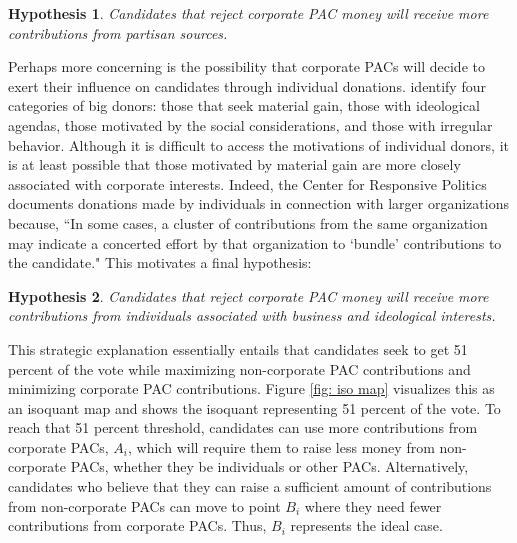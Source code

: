 \documentclass[12pt]{article}
\newtheorem{hyp}{Hypothesis}
\begin{document}
 \begin{hyp}
     Candidates that reject corporate PAC money will receive more contributions from partisan sources.  
 \end{hyp}
 
Perhaps more concerning is the possibility that corporate PACs will decide to exert their influence on candidates through individual donations. \citet{francia2003} identify four categories of big donors: those that seek material gain, those with ideological agendas, those motivated by the social considerations, and those with irregular behavior. Although it is difficult to access the motivations of individual donors, it is at least possible that those motivated by material gain are more closely associated with corporate interests. Indeed, the Center for Responsive Politics documents donations made by individuals in connection with larger organizations because, ``In some cases, a cluster of contributions from the same organization may indicate a concerted effort by that organization to `bundle' contributions to the candidate." This motivates a final hypothesis:
 
 \begin{hyp}
     Candidates that reject corporate PAC money will receive more contributions from individuals associated with business and ideological interests. 
 \end{hyp}
 
  This strategic explanation essentially entails that candidates seek to get 51 percent of the vote while maximizing non-corporate PAC contributions and minimizing corporate PAC contributions. Figure \ref{fig: iso map} visualizes this as an isoquant map and shows the isoquant representing 51 percent of the vote. To reach that 51 percent threshold, candidates can use more contributions from corporate PACs, $A_i$, which will require them to raise less money from non-corporate PACs, whether they be individuals or other PACs. Alternatively, candidates who believe that they can raise a sufficient amount of contributions from non-corporate PACs can move to point $B_i$ where they need fewer contributions from corporate PACs. Thus, $B_i$ represents the ideal case. 
 
\end{document}
